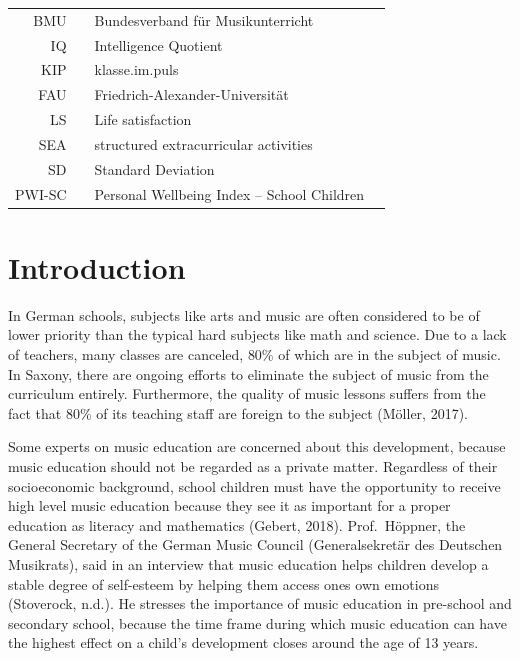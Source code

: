 \documentclass[a4, 12pt]{article}
\begin{document}
\begin{tabular}{rp{0.2cm}lp{1cm}}
    BMU     & &  Bundesverband für Musikunterricht   \\
    IQ     & &  Intelligence Quotient  \\
    KIP    & &  klasse.im.puls  \\
    FAU     & &  Friedrich-Alexander-Universität  \\
    LS     & &  Life satisfaction  \\
    SEA     & &  structured extracurricular activities  \\
    SD     & &  Standard Deviation  \\
    PWI-SC     & &  Personal Wellbeing Index -- School Children  \\
\end{tabular}

\clearpage
\listoftables

\clearpage
\listoffigures

\clearpage
\pagestyle{plain}
\doublespacing

\hypertarget{introduction}{%
\section{Introduction}\label{introduction}}

\label{ch:introduction}
In German schools, subjects like arts and music are often considered to be of lower priority than the typical hard subjects like math and science. Due to a lack of teachers, many classes are canceled, 80\% of which are in the subject of music. In Saxony, there are ongoing efforts to eliminate the subject of music from the curriculum entirely. Furthermore, the quality of music lessons suffers from the fact that 80\% of its teaching staff are foreign to the subject (Möller, 2017).

Some experts on music education are concerned about this development, because music education should not be regarded as a private matter. Regardless of their socioeconomic background, school children must have the opportunity to receive high level music education because they see it as important for a proper education as literacy and mathematics (Gebert, 2018). Prof.~Höppner, the General Secretary of the German Music Council (Generalsekretär des Deutschen Musikrats), said in an interview that music education helps children develop a stable degree of self-esteem by helping them access ones own emotions (Stoverock, n.d.). He stresses the importance of music education in pre-school and secondary school, because the time frame during which music education can have the highest effect on a child's development closes around the age of 13 years.
\end{document}
